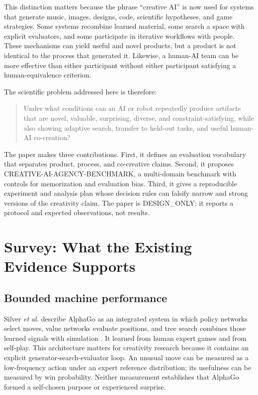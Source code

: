 \documentclass[conference]{IEEEtran}
\begin{document}
This distinction matters because the phrase ``creative AI'' is now used for systems that
generate music, images, designs, code, scientific hypotheses, and game strategies. Some
systems recombine learned material, some search a space with explicit evaluators, and
some participate in iterative workflows with people. These mechanisms can yield useful
and novel products, but a product is not identical to the process that generated it.
Likewise, a human-AI team can be more effective than either participant without either
participant satisfying a human-equivalence criterion.

The scientific problem addressed here is therefore:

\begin{quote}
Under what conditions can an AI or robot repeatedly produce artifacts that are novel,
valuable, surprising, diverse, and constraint-satisfying, while also showing adaptive
search, transfer to held-out tasks, and useful human-AI co-creation?
\end{quote}

The paper makes three contributions. First, it defines an evaluation vocabulary that
separates product, process, and co-creative claims. Second, it proposes
CREATIVE-AI-AGENCY-BENCHMARK, a multi-domain benchmark with controls for memorization and
evaluation bias. Third, it gives a reproducible experiment and analysis plan whose
decision rules can falsify narrow and strong versions of the creativity claim. The
paper is DESIGN\_ONLY: it reports a protocol and expected observations, not results.

\section{Survey: What the Existing Evidence Supports}
\label{sec:survey}

\subsection{Bounded machine performance}

Silver \emph{et al.} describe AlphaGo as an integrated system in which policy networks
select moves, value networks evaluate positions, and tree search combines those learned
signals with simulation \cite{silver2016}. It learned from human expert games and from
self-play. This architecture matters for creativity research because it contains an
explicit generator-search-evaluator loop. An unusual move can be measured as a
low-frequency action under an expert reference distribution; its usefulness can be
measured by win probability. Neither measurement establishes that AlphaGo formed a
self-chosen purpose or experienced surprise.
\end{document}
